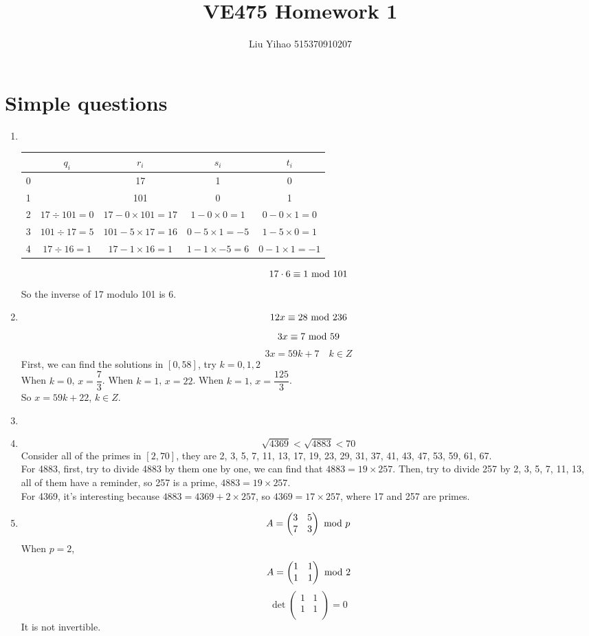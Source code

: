 \documentclass{article}
\title{VE475 Homework 1}
\author{Liu Yihao 515370910207}
\date{}
\renewcommand{\mod}{{\rm\ mod\ }}
\begin{document}
\maketitle

\section{Simple questions}
\begin{enumerate}
\item \ 
\begin{center}
\begin{tabular}{|c|c|c|c|c|}
\hline
& $q_i$ & $r_i$ & $s_i$ & $t_i$\\\hline
0 & & 17 & 1 & 0\\\hline
1 & & 101 & 0 & 1\\\hline
2 & $17\div101=0$ & $17-0\times101=17$ & $1-0\times0=1$ & $0-0\times1=0$\\\hline
3 & $101\div17=5$ & $101-5\times17=16$ & $0-5\times1=-5$ & $1-5\times0=1$\\\hline
4 & $17\div16=1$ & $17-1\times16=1$ & $1-1\times-5=6$ & $0-1\times1=-1$\\\hline
\end{tabular}
\end{center}
$$17\cdot6\equiv1\mod101$$
So the inverse of 17 modulo 101 is 6.

\item
$$12x\equiv28\mod236$$
$$3x\equiv7\mod59$$
$$3x=59k+7\quad k\in Z$$
First, we can find the solutions in $[0,58]$, try $k=0,1,2$\\
When $k=0$, $x=\dfrac{7}{3}$. When $k=1$, $x=22$. When $k=1$, $x=\dfrac{125}{3}$.\\
So $x=59k+22$, $k\in Z$.

\item

\item
$$\sqrt{4369}<\sqrt{4883}<70$$
Consider all of the primes in $[2,70]$, they are 2, 3, 5, 7, 11, 13, 17, 19, 23, 29, 31, 37, 41, 43, 47, 53, 59, 61, 67.\\
For 4883, first, try to divide 4883 by them one by one, we can find that $4883=19\times 257$. Then, try to divide 257 by 2, 3, 5, 7, 11, 13, all of them have a reminder, so 257 is a prime, $4883=19\times 257$.\\
For 4369, it's interesting because $4883=4369+2\times257$, so $4369=17\times257$, where 17 and 257 are primes.

\item
$$A=\begin{pmatrix}3&5\\7&3\\\end{pmatrix}\mod p$$
When $p=2$, 
$$A=\begin{pmatrix}1&1\\1&1\\\end{pmatrix}\mod 2$$
$$\det\begin{pmatrix}1&1\\1&1\\\end{pmatrix}=0$$
It is not invertible.\\


\end{enumerate}
\end{document}
